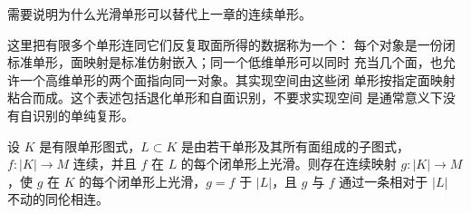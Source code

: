 需要说明为什么光滑单形可以替代上一章的连续单形。

这里把有限多个单形连同它们反复取面所得的数据称为一个：
每个对象是一份闭标准单形，面映射是标准仿射嵌入；同一个低维单形可以同时
充当几个面，也允许一个高维单形的两个面指向同一对象。其实现空间由这些闭
单形按指定面映射粘合而成。这个表述包括退化单形和自面识别，不要求实现空间
是通常意义下没有自识别的单纯复形。

\begin{lemma}[相对光滑逼近]\label{lem:relative-smoothing-delta-complex}
设 $K$ 是有限单形图式，$L\subset K$ 是由若干单形及其所有面组成的子图式，
$f:|K|\to M$ 连续，并且 $f$ 在 $L$ 的每个闭单形上光滑。则存在连续映射
$g:|K|\to M$，使 $g$ 在 $K$ 的每个闭单形上光滑，$g=f$ 于 $|L|$，且
$g$ 与 $f$ 通过一条相对于 $|L|$ 不动的同伦相连。
\end{lemma}
